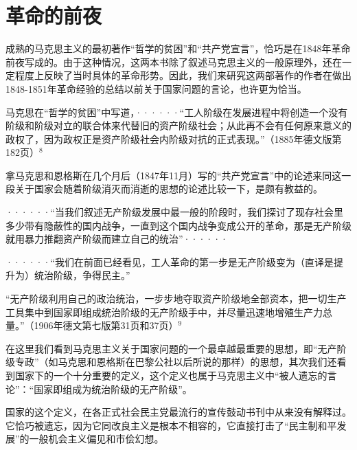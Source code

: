 \chapter{革命的前夜} %

成熟的马克思主义的最初著作“哲学的贫困”和“共产党宣言”，恰巧是在1848年革命前夜写成的。由于这种情况，这两本书除了叙述马克思主义的一般原理外，还在一定程度上反映了当时具体的革命形势。因此，我们来研究这两部著作的作者在做出1848-1851年革命经验的总结以前关于国家问题的言论，也许更为恰当。

\pskip
\leftskip=10mm
\small

马克思在“哲学的贫困”中写道，······“工人阶级在发展进程中将创造一个没有阶级和阶级对立的联合体来代替旧的资产阶级社会；从此再不会有任何原来意义的政权了，因为政权正是资产阶级社会内阶级对抗的正式表现。”（1885年德文版第182页）$^{8}$

\leftskip=0mm
\normalsize
\pskip

拿马克思和恩格斯在几个月后（1847年11月）写的“共产党宣言”中的论述来同这一段关于国家会随着阶级消灭而消逝的思想的论述比较一下，是颇有教益的。

\pskip
\leftskip=10mm
\small

······“当我们叙述无产阶级发展中最一般的阶段时，我们探讨了现存社会里多少带有隐蔽性的国内战争，一直到这个国内战争变成公开的革命，那是无产阶级就用暴力推翻资产阶级而建立自己的统治”······

······“我们在前面已经看见，工人革命的第一步是无产阶级变为（直译是提升为）统治阶级，争得民主。”

“无产阶级利用自己的政治统治，一步步地夺取资产阶级地全部资本，把一切生产工具集中到国家即组成统治阶级的无产阶级手中，并尽量迅速地增殖生产力总量。”（1906年德文第七版第31页和37页）$^{9}$

\leftskip=0mm
\normalsize
\pskip

在这里我们看到马克思主义关于国家问题的一个最卓越最重要的思想，即“无产阶级专政”（如马克思和恩格斯在巴黎公社以后所说的那样）的思想，其次我们还看到国家下的一个十分重要的定义，这个定义也属于马克思主义中“被人遗忘的言论”：“{\kaishu 国家即组成为统治阶级的无产阶级}”。

国家的这个定义，在各正式社会民主党最流行的宣传鼓动书刊中从来没有解释过。它恰巧被遗忘，因为它同改良主义是根本不相容的，它直接打击了“民主制和平发展”的一般机会主义偏见和市侩幻想。

